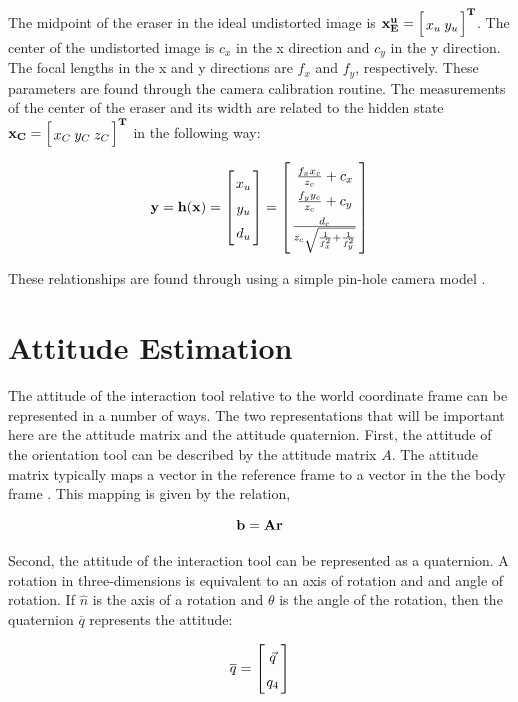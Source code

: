 \documentclass{article}
\newcommand{\mat}[2][ccccccccccccccccccccccccccccccccccccccccccccc]{\left[
        \arraycolsep=1.2pt\def\arraystretch{1.5}
        \begin{array}{#1} #2 \\ 
        \end{array} 
        \right]}
\begin{document}
\begin{flushleft}
\medskip

The midpoint of the eraser in the ideal undistorted image is $\bf{x^u_E} = \mat{ x_u & y_u }^{T}$. The center of the undistorted image is $c_x$ in the x direction and $c_y$ in the y direction. The focal lengths in the x and y directions are $f_x$ and $f_y$, respectively. These parameters are found through the camera calibration routine. The measurements of the center of the eraser and its width are related to the hidden state $\bf{\bf{x_C}} = \mat{ x_C & y_C & z_C }^{T}$ in the following way: 

\[
    \bf{\bf{y}} = h(\bf{\bf{x}})
        = \mat{x_u \\ y_u \\ d_{u} }
        = \mat{ \frac{f_x x_c}{z_c} + c_x \\ 
             \frac{f_y y_c}{z_c} + c_y \\ 
             \frac{d_c}{z_c \sqrt{\frac{1}{f_x^{2}} + \frac{1}{f_y^{2}}}}
           }
\]

These relationships are found through using a simple pin-hole camera model \cite{Tsai1987}.

\section{Attitude Estimation}

The attitude of the interaction tool relative to the world coordinate frame can be represented in a number of ways. The two representations that will be important here are the attitude matrix and the attitude quaternion. First, the attitude of the orientation tool can be described by the attitude matrix $A$. The attitude matrix typically maps a vector in the reference frame to a vector in the the body frame \cite{Markley2007}. This mapping is given by the relation, 

\[ \bf{b} = A \bf{r} \]

Second, the attitude of the interaction tool can be represented as a quaternion. A rotation in three-dimensions is equivalent to an axis of rotation and and angle of rotation. If $\hat{n}$ is the axis of a rotation and $\theta$ is the angle of the rotation, then the quaternion $\overline{q}$ represents the attitude: 

\[ \overline{q} = \mat{\vec{q} \\ q_4} \] 


\end{flushleft}
\end{document}
